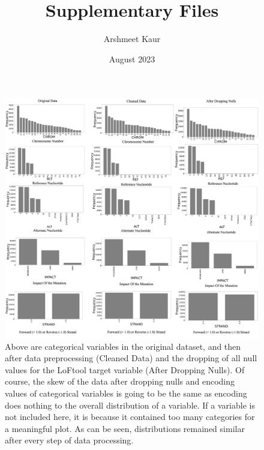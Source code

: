 \documentclass[journal,twoside,web]{ieeecolor}
\title{Supplementary Files}
\author{Arshmeet Kaur}
\date{August 2023}
\begin{document}
\clearpage
\begin{figure}[!t]
\centering
\includegraphics[width=\textwidth]{Supplementary Figure 1 .png}
\caption{Above are categorical variables in the original dataset, and then after data preprocessing (Cleaned Data) and the dropping of all null values for the LoFtool target variable (After Dropping Nulls). Of course, the skew of the data after dropping nulls and encoding values of categorical variables is going to be the same as encoding does nothing to the overall distribution of a variable. If a variable is not included here, it is because it contained too many categories for a meaningful plot. As can be seen, distributions remained similar after every step of data processing.}
\label{fig1}
\end{figure}
\end{document}
